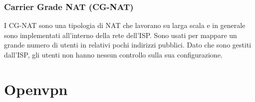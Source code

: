 \subsubsection{Carrier Grade NAT (CG-NAT)}

I CG-NAT \cite{Carrier-grade_NAT} sono una tipologia di NAT che lavorano su larga scala e in generale sono implementati all'interno della rete dell'ISP. Sono usati per mappare un grande numero di utenti in relativi pochi indirizzi pubblici.
Dato che sono gestiti dall'ISP, gli utenti non hanno nessun controllo sulla sua configurazione.


\section{Openvpn \ok}

